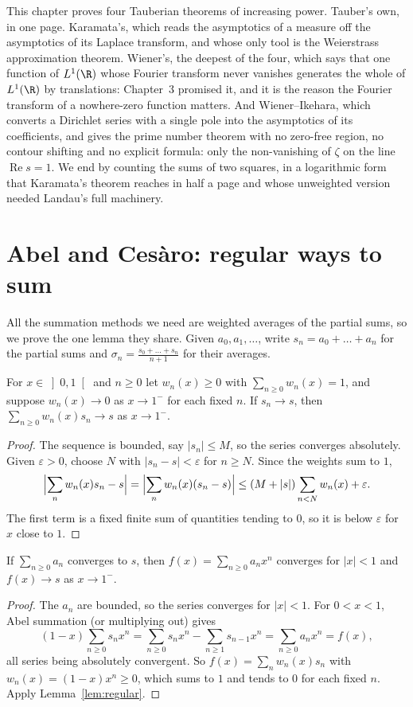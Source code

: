 This chapter proves four Tauberian theorems of increasing power. Tauber's own, in one page. Karamata's, which reads the asymptotics of a measure off the
asymptotics of its Laplace transform, and whose only tool is the Weierstrass approximation theorem. Wiener's, the deepest of the four, which says that one
function of $L^1(\R)$ whose Fourier transform never vanishes generates the whole of $L^1(\R)$ by translations: Chapter~3 promised it, and it is the reason
the Fourier transform of a nowhere-zero function matters. And Wiener--Ikehara, which converts a Dirichlet series with a single pole into the asymptotics of
its coefficients, and gives the prime number theorem with no zero-free region, no contour shifting and no explicit formula: only the non-vanishing of
$\zeta$ on the line $\operatorname{Re}s=1$. We end by counting the sums of two squares, in a logarithmic form that Karamata's theorem reaches in half a page
and whose unweighted version needed Landau's full machinery.

\section{Abel and Ces\`aro: regular ways to sum}

All the summation methods we need are weighted averages of the partial sums, so we prove the one lemma they share. Given $a_0,a_1,\dots$, write
$s_n=a_0+\dots+a_n$ for the partial sums and $\sigma_n=\frac{s_0+\dots+s_n}{n+1}$ for their averages.

\begin{lemma}\label{lem:regular}
For $x\in\left]0,1\right[$ and $n\ge0$ let $w_n(x)\ge0$ with $\sum_{n\ge0}w_n(x)=1$, and suppose $w_n(x)\to0$ as $x\to1^-$ for each fixed $n$. If
$s_n\to s$, then $\sum_{n\ge0}w_n(x)s_n\to s$ as $x\to1^-$.
\end{lemma}
\begin{proof}
The sequence is bounded, say $|s_n|\le M$, so the series converges absolutely. Given $\varepsilon>0$, choose $N$ with $|s_n-s|<\varepsilon$ for $n\ge N$. Since the
weights sum to $1$,
\[
\Bigl|\sum_nw_n(x)s_n-s\Bigr|=\Bigl|\sum_nw_n(x)(s_n-s)\Bigr|\le(M+|s|)\sum_{n<N}w_n(x)+\varepsilon.
\]
The first term is a fixed finite sum of quantities tending to $0$, so it is below $\varepsilon$ for $x$ close to $1$.
\end{proof}

\begin{theorem}[Abel, 1826]\label{thm:abel}
If $\sum_{n\ge0}a_n$ converges to $s$, then $f(x)=\sum_{n\ge0}a_nx^n$ converges for $|x|<1$ and $f(x)\to s$ as $x\to1^-$.
\end{theorem}
\begin{proof}
The $a_n$ are bounded, so the series converges for $|x|<1$. For $0<x<1$, Abel summation (or multiplying out) gives
\[
(1-x)\sum_{n\ge0}s_nx^n=\sum_{n\ge0}s_nx^n-\sum_{n\ge1}s_{n-1}x^n=\sum_{n\ge0}a_nx^n=f(x),
\]
all series being absolutely convergent. So $f(x)=\sum_nw_n(x)s_n$ with $w_n(x)=(1-x)x^n\ge0$, which sums to $1$ and tends to $0$ for each fixed $n$. Apply
Lemma~\ref{lem:regular}.
\end{proof}

